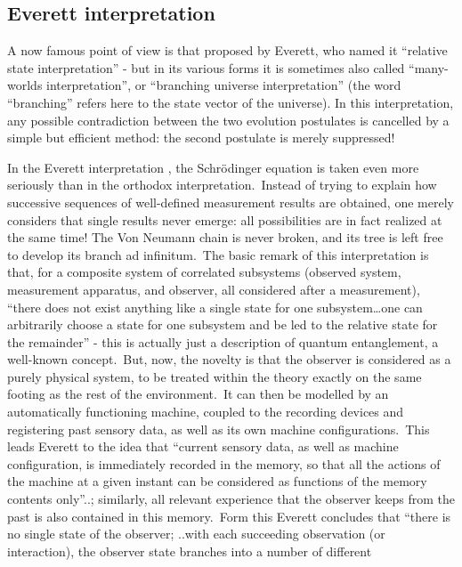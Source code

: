 \documentclass[12pt,onecolumn]{article}%
\begin{document}
\subsection{Everett interpretation}

\label{ever}

A now famous point of view is that proposed by Everett, who named it
``relative state interpretation'' - but in its various forms it is sometimes
also called ``many-worlds interpretation'', or ``branching universe
interpretation'' (the word ``branching'' refers here to the state vector of
the universe). In this interpretation, any possible contradiction between the
two evolution postulates is cancelled by a simple but efficient method: the
second postulate is merely suppressed!

In the Everett interpretation \cite{Everett}, the Schr\"{o}dinger equation is
taken even more seriously than in the orthodox interpretation.\ Instead of
trying to explain how successive sequences of well-defined measurement results
are obtained, one merely considers that single results never emerge: all
possibilities are in fact realized at the same time! The Von Neumann chain is
never broken, and its tree is left free to develop its branch ad
infinitum.\ The basic remark of this interpretation is that, for a composite
system of correlated subsystems (observed system, measurement apparatus, and
observer, all considered after a measurement), ``there does not exist anything
like a single state for one subsystem\ldots one can arbitrarily choose a state
for one subsystem and be led to the relative state for the remainder'' - this
is actually just a description of quantum entanglement, a well-known
concept.\ But, now, the novelty is that the observer is considered as a purely
physical system, to be treated within the theory exactly on the same footing
as the rest of the environment.\ It can then be modelled by an automatically
functioning machine, coupled to the recording devices and registering past
sensory data, as well as its own machine configurations.\ This leads Everett
to the idea that ``current sensory data, as well as machine configuration, is
immediately recorded in the memory, so that all the actions of the machine at
a given instant can be considered as functions of the memory contents
only''..; similarly, all relevant experience that the observer keeps from the
past is also contained in this memory.\ Form this Everett concludes that
``there is no single state of the observer; ..with each succeeding observation
(or interaction), the observer state branches into a number of different
\end{document}
